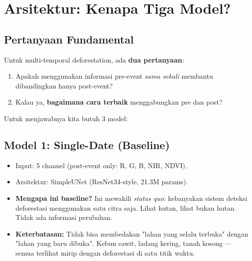 \documentclass[10pt,a4paper,onecolumn]{article}
\begin{document}
\section{Arsitektur: Kenapa Tiga Model?}

\subsection{Pertanyaan Fundamental}
Untuk multi-temporal deforestation, ada \textbf{dua pertanyaan}:
\begin{enumerate}[nosep]
    \item Apakah menggunakan informasi pre-event \textit{sama sekali}
          membantu dibandingkan hanya post-event?
    \item Kalau ya, \textbf{bagaimana cara terbaik} menggabungkan
          pre dan post?
\end{enumerate}

Untuk menjawabnya kita butuh 3 model:

\subsection{Model 1: Single-Date (Baseline)}
\begin{itemize}[nosep]
    \item Input: 5 channel (post-event only: R, G, B, NIR, NDVI).
    \item Arsitektur: SimpleUNet (ResNet34-style, 21.3M params).
    \item \textbf{Mengapa ini baseline?} Ini mewakili \textit{status
          quo}: kebanyakan sistem deteksi deforestasi menggunakan
          satu citra saja. Lihat hutan, lihat bukan hutan. Tidak ada
          informasi perubahan.
    \item \textbf{Keterbatasan:} Tidak bisa membedakan "lahan yang
          selalu terbuka" dengan "lahan yang baru dibuka". Kebun
          sawit, ladang kering, tanah kosong — semua terlihat mirip
          dengan deforestasi di satu titik waktu.
\end{itemize}
\end{document}
